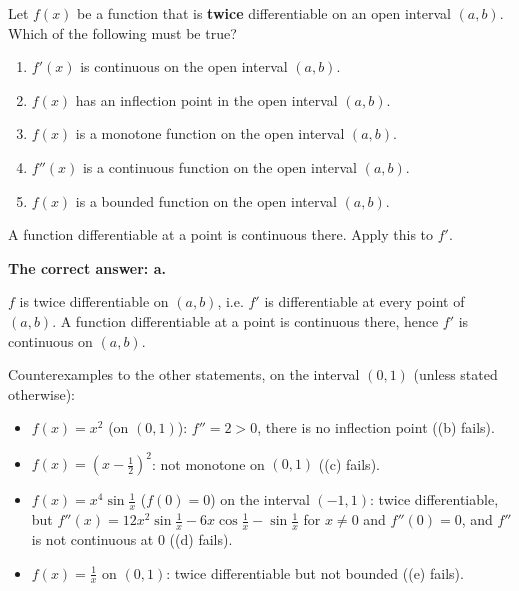 
\begin{question}
Let $f(x)$ be a function that is \textbf{twice} differentiable on an open interval $(a,b)$. Which of the following must be true?
\begin{enumerate}
  \item $f'(x)$ is continuous on the open interval $(a,b)$.
  \item $f(x)$ has an inflection point in the open interval $(a,b)$.
  \item $f(x)$ is a monotone function on the open interval $(a,b)$.
  \item $f''(x)$ is a continuous function on the open interval $(a,b)$.
  \item $f(x)$ is a bounded function on the open interval $(a,b)$.
\end{enumerate}
\end{question}

\begin{hint}
A function differentiable at a point is continuous there. Apply this to $f'$.
\end{hint}

\begin{solution}
\textbf{The correct answer: a.}

$f$ is twice differentiable on $(a,b)$, i.e. $f'$ is differentiable at every point of $(a,b)$. A function differentiable at a point is continuous there, hence $f'$ is continuous on $(a,b)$.

Counterexamples to the other statements, on the interval $(0,1)$ (unless stated otherwise):
\begin{itemize}
  \item $f(x)=x^2$ (on $(0,1)$): $f''=2>0$, there is no inflection point ((b) fails).
  \item $f(x)=\left(x-\frac12\right)^2$: not monotone on $(0,1)$ ((c) fails).
  \item $f(x)=x^4\sin\frac1x$ ($f(0)=0$) on the interval $(-1,1)$: twice differentiable, but $f''(x)=12x^2\sin\frac1x-6x\cos\frac1x-\sin\frac1x$ for $x\neq0$ and $f''(0)=0$, and $f''$ is not continuous at $0$ ((d) fails).
  \item $f(x)=\frac1x$ on $(0,1)$: twice differentiable but not bounded ((e) fails).
\end{itemize}
\end{solution}
